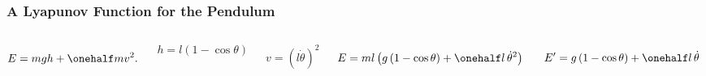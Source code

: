 \documentclass[12pt]{beamer}
\begin{document}
\begin{frame}
\frametitle{A Lyapunov Function for the Pendulum}

\begin{columns}

\[
E = mgh + \onehalf m v^2.
\]

\[
h = l(1-\cos\theta)
\]

\[
v = (l\dot\theta)^2
\]

\[
E
	= ml \left( g \, (1-\cos\theta) + \onehalf l \, \dot\theta^2 \right)
\]

\[
E' = g \, (1-\cos\theta) + \onehalf l \, \dot\theta
\]

\includegraphics[width=\linewidth]{Simple_gravity_pendulum.png}

\end{columns}

\end{frame}
\end{document}
